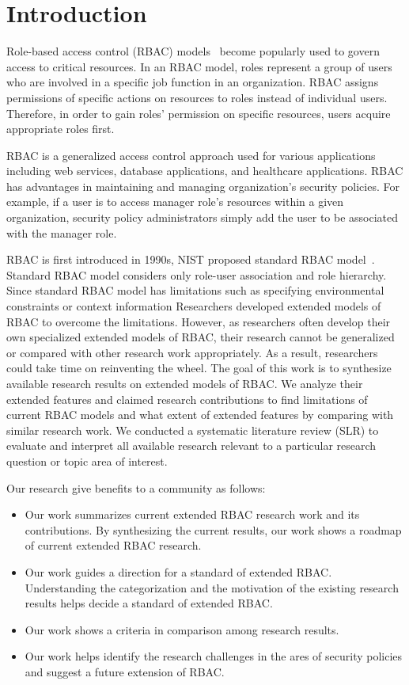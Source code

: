 \section{Introduction} \label{sec:introduction}

Role-based access control (RBAC) models~\cite{ferraiolo:rbac} become popularly used
to govern access to critical resources.
In an RBAC model, roles represent a group of users who are
involved in a specific job function in an organization. 
RBAC assigns permissions of specific actions on resources to roles
instead of individual users.
Therefore, in order to gain roles' permission on specific resources, users acquire appropriate roles first.

RBAC is a generalized access control approach used for various applications including
web services, database applications, and healthcare applications.
RBAC has advantages in maintaining and managing organization's security policies.
For example, if a user is to access manager role's resources within a given
organization, security policy administrators simply add the user to be associated with the manager role.

RBAC is first introduced in 1990s, NIST proposed standard RBAC model~\cite{ferraiolo:rbac}.
Standard RBAC model considers only role-user association and role hierarchy.
Since standard RBAC model has limitations such as specifying environmental constraints or context information 
Researchers developed extended models of RBAC to overcome the limitations.
However, as researchers often develop their own specialized extended models of RBAC,
their research cannot be generalized or compared with other research work appropriately.
As a result, researchers could take time on reinventing the wheel.    
The goal of this work is to synthesize available research results on extended models of RBAC. We analyze their extended features and claimed research contributions to find limitations of current RBAC models and what extent of extended features by
comparing with similar research work. 
We conducted a systematic literature review (SLR) to evaluate and interpret all available research relevant to a particular research question or topic area of interest.

Our research give benefits to a community as follows:
\begin{itemize}
	\item Our work summarizes current extended RBAC research work and its contributions. By synthesizing the current results, our work shows a roadmap of current extended RBAC research.	
	\item Our work guides a direction for a standard of extended RBAC. Understanding the categorization and the motivation of the existing
	research results helps decide a standard of extended RBAC.
	\item Our work shows a criteria in comparison among research results.
	\item Our work helps identify the research challenges in the ares of security policies and suggest a future extension of RBAC.			
\end{itemize}
